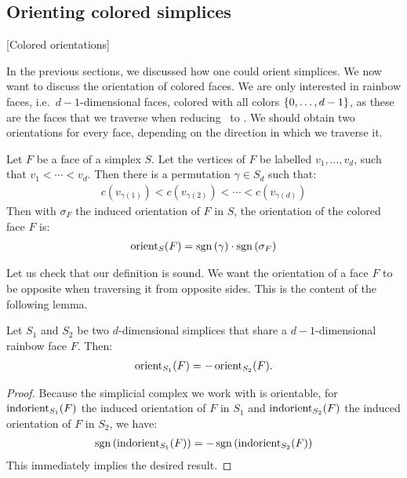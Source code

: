 \subsection{Orienting colored simplices}[Colored orientations]

In the previous sections, we discussed how one could orient simplices. We now want to discuss the orientation of colored faces. We are only interested in rainbow faces, i.e.~$d-1$-dimensional faces, colored with all colors $\left\{0, \dots, d-1\right\}$, as these are the faces that we traverse when reducing \Sperner\ to \EndOfLine. We should obtain two orientations for every face, depending on the direction in which we traverse it.

\begin{definition}
	Let $F$ be a face of a simplex $S$. Let the vertices of $F$ be labelled $v_1, \dots, v_d$, such that $v_1 < \cdots < v_d$. Then there is a permutation $\gamma \in S_d$ such that:
	\begin{align*}
		c(v_{\gamma(1)}) < c(v_{\gamma(2)}) < \cdots < c(v_{\gamma(d)})
	\end{align*}
	Then with $\sigma_F$ the induced orientation of $F$ in $S$, the orientation of the colored face $F$ is:
	\begin{align*}
		\operatorname{orient}_S(F) = \operatorname{sgn}\left(\gamma\right) \cdot \operatorname{sgn}\left(\sigma_F\right)
	\end{align*}
\end{definition}

Let us check that our definition is sound. We want the orientation of a face $F$ to be opposite when traversing it from opposite sides. This is the content of the following lemma.

\begin{lemma}
	\label{lem:soundness_of_colored_orientability}
	Let $S_1$ and $S_2$ be two $d$-dimensional simplices that share a $d-1$-dimensional rainbow face $F$. Then:
	\begin{align*}
		\operatorname{orient}_{S_1}(F) = - \operatorname{orient}_{S_2}(F).
	\end{align*}
\end{lemma}
\begin{proof}
	Because the simplicial complex we work with is orientable, for $\operatorname{indorient}_{S_1}(F)$ the induced orientation of $F$ in $S_1$ and $\operatorname{indorient}_{S_2}(F)$ the induced orientation of $F$ in $S_2$, we have:
	\begin{align*}
		\operatorname{sgn}\left(\operatorname{indorient}_{S_1}(F)\right) = - \operatorname{sgn}\left(\operatorname{indorient}_{S_2}(F)\right)
	\end{align*}
	This immediately implies the desired result.
\end{proof}

